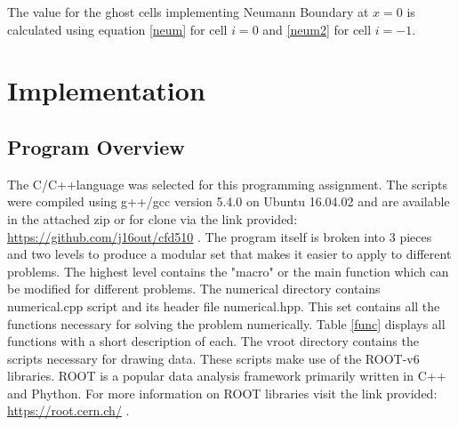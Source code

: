 \documentclass[paper=a4, fontsize=11pt, abstract=on]{scrartcl}
\numberwithin{equation}{section}		%
\numberwithin{figure}{section}			%
\numberwithin{table}{section}				%
\begin{document}
The value for the ghost cells implementing Neumann Boundary at $x=0$ is calculated using equation \ref{neum} for cell $i = 0$ and \ref{neum2} for cell $i = -1$.
 


\section{Implementation}
\subsection{Program Overview}
The C/C++language was selected for this programming assignment. The scripts were compiled using g++/gcc version 5.4.0 on Ubuntu 16.04.02 and are available in the attached zip or for clone via the link provided: \url{https://github.com/j16out/cfd510} . The program itself is broken into 3 pieces and two levels to produce a modular set that makes it easier to apply to different problems. The highest level contains the "macro" or the main function which can be modified for different problems. The numerical directory contains numerical.cpp script and its header file numerical.hpp. This set contains all the functions necessary for solving the problem numerically. Table \ref{func} displays all functions with a short description of each. The vroot directory contains the scripts necessary for drawing data. These scripts make use of the ROOT-v6 libraries. ROOT is a popular data analysis framework primarily written in C++ and Phython. For more information on ROOT libraries visit the link provided: \url{https://root.cern.ch/} .
\end{document}
